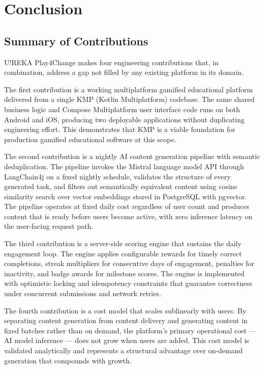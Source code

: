 %
%
\chapter{Conclusion}
\label{chap:conclusion}

\section{Summary of Contributions}

U!REKA Play4Change makes four engineering contributions that, in combination, address a gap not filled by any existing platform in its domain.

The first contribution is a working multiplatform gamified educational platform delivered from a single KMP (Kotlin Multiplatform) codebase. The same shared business logic and Compose Multiplatform user interface code runs on both Android and iOS, producing two deployable applications without duplicating engineering effort. This demonstrates that KMP is a viable foundation for production gamified educational software at this scope.

The second contribution is a nightly AI content generation pipeline with semantic deduplication. The pipeline invokes the Mistral language model API through LangChain4j on a fixed nightly schedule, validates the structure of every generated task, and filters out semantically equivalent content using cosine similarity search over vector embeddings stored in PostgreSQL with pgvector. The pipeline operates at fixed daily cost regardless of user count and produces content that is ready before users become active, with zero inference latency on the user-facing request path.

The third contribution is a server-side scoring engine that sustains the daily engagement loop. The engine applies configurable rewards for timely correct completions, streak multipliers for consecutive days of engagement, penalties for inactivity, and badge awards for milestone scores. The engine is implemented with optimistic locking and idempotency constraints that guarantee correctness under concurrent submissions and network retries.

The fourth contribution is a cost model that scales sublinearly with users. By separating content generation from content delivery and generating content in fixed batches rather than on demand, the platform's primary operational cost --- AI model inference --- does not grow when users are added. This cost model is validated analytically and represents a structural advantage over on-demand generation that compounds with growth.

